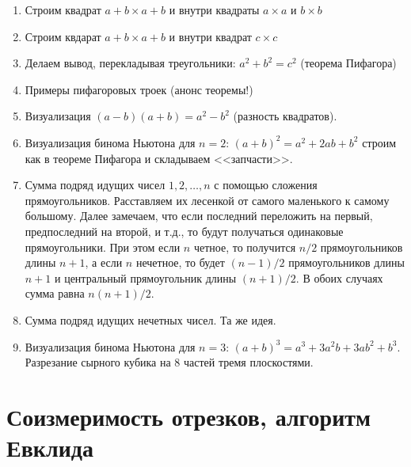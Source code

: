 \begin{enumerate}
\item Строим квадрат $a+b\times a+b$ и внутри квадраты $a\times a$ и $b\times b$
\item Строим квдарат $a+b\times a+b$ и внутри квадрат $c\times c$
\item Делаем вывод, перекладывая треугольники: $a^2+b^2=c^2$ (теорема Пифагора)
\item Примеры пифагоровых троек (анонс теоремы!)
\item Визуализация $(a-b)(a+b)=a^2-b^2$ (разность квадратов).
\item Визуализация бинома Ньютона для $n=2$: $(a+b)^2=a^2+2ab+b^2$ строим как в теореме Пифагора и складываем <<запчасти>>.
\item Сумма подряд идущих чисел $1,2,\dots,n$ с помощью сложения прямоугольников. Расставляем их лесенкой от самого маленького к самому большому. Далее замечаем, что если последний переложить на первый, предпоследний на второй, и т.д., то будут получаться одинаковые прямоугольники. При этом если $n$ четное, то получится $n/2$ прямоугольников длины $n+1$, а если $n$ нечетное, то будет $(n-1)/2$ прямоугольников длины $n+1$ и центральный прямоугольник длины $(n+1)/2$. В обоих случаях сумма равна $n(n+1)/2$.
\item Сумма подряд идущих нечетных чисел. Та же идея.
\item Визуализация бинома Ньютона для $n=3$: $(a+b)^3 = a^3+3a^2b+3ab^2+b^3$. Разрезание сырного кубика на 8 частей тремя плоскостями.
\end{enumerate}


\section{Соизмеримость отрезков, алгоритм Евклида}



